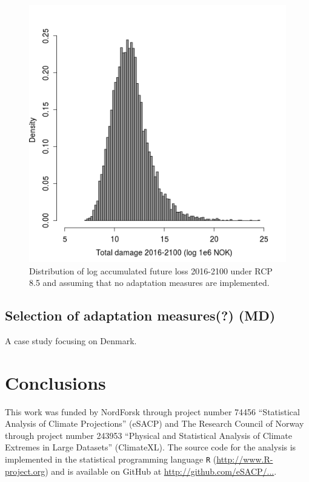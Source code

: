\documentclass[draft,linenumbers]{agujournal}
\begin{document}
\begin{figure}
\begin{center}
\includegraphics[width=\linewidth]{AccumulatedFutureLoss.png}
\caption{Distribution of log  accumulated future loss 2016-2100 under RCP 8.5 and assuming that no adaptation measures are implemented.} 
\label{fig:NoAction}
\end{center}
\end{figure}


\subsection{Selection of adaptation measures(?) {\color{blue} (MD)}}

A case study focusing on Denmark. 

\section{Conclusions}

\begin{acknowledgments}
This work was funded by NordForsk through project number 74456 ``Statistical Analysis of Climate Projections'' (eSACP) and The Research Council of Norway through project number 243953 ``Physical and Statistical Analysis of Climate Extremes in Large Datasets'' (ClimateXL). The source code for the analysis is implemented in the statistical programming language {\tt R} (\url{http://www.R-project.org}) and is available on GitHub at \url{http://github.com/eSACP/...}.
\end{acknowledgments}
\end{document}
